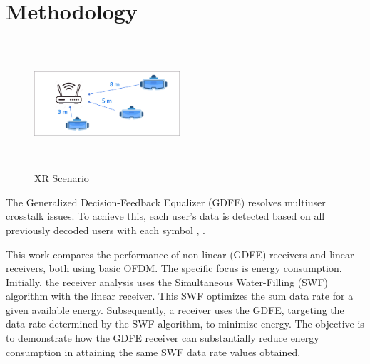 \section{Methodology}

\begin{figure}
    \centering
    \includegraphics[width=0.48\textwidth, height=4.8cm]{figures/3_5_8_scenario.png}
    \caption{XR Scenario}
    \label{fig:xr}
\end{figure}

The Generalized Decision-Feedback Equalizer (GDFE) resolves multiuser crosstalk issues. To achieve this, each user's data is detected based on all previously decoded users with each symbol \cite{book}, \cite{yu2004sum}. %

This work compares the performance of non-linear (GDFE) receivers \cite{GDFE} and linear receivers\cite{chang1966synthesis}, both using basic OFDM.  The specific focus is energy consumption. Initially, the receiver analysis uses the Simultaneous Water-Filling (SWF) algorithm\cite{book} with the linear receiver.  This SWF optimizes the sum data rate for a given available energy. Subsequently, a receiver uses the GDFE, targeting the data rate determined by the SWF algorithm, to minimize energy. The objective is to demonstrate how the GDFE receiver can substantially reduce energy consumption in attaining the same SWF data rate values obtained. 

